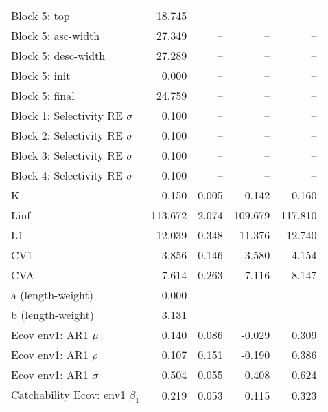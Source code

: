 \documentclass[
]{article}
\begin{document}
\begin{landscape}
\begin{longtable}[t]{lrrrr}
\addlinespace
Block 5: top & 18.745 & -- & -- & --\\
Block 5: asc-width & 27.349 & -- & -- & --\\
Block 5: desc-width & 27.289 & -- & -- & --\\
Block 5: init & 0.000 & -- & -- & --\\
Block 5: final & 24.759 & -- & -- & --\\
\addlinespace
Block 1: Selectivity RE $\sigma$ & 0.100 & -- & -- & --\\
Block 2: Selectivity RE $\sigma$ & 0.100 & -- & -- & --\\
Block 3: Selectivity RE $\sigma$ & 0.100 & -- & -- & --\\
Block 4: Selectivity RE $\sigma$ & 0.100 & -- & -- & --\\
K & 0.150 & 0.005 & 0.142 & 0.160\\
\addlinespace
Linf & 113.672 & 2.074 & 109.679 & 117.810\\
L1 & 12.039 & 0.348 & 11.376 & 12.740\\
CV1 & 3.856 & 0.146 & 3.580 & 4.154\\
CVA & 7.614 & 0.263 & 7.116 & 8.147\\
a (length-weight) & 0.000 & -- & -- & --\\
\addlinespace
b (length-weight) & 3.131 & -- & -- & --\\
Ecov env1: AR1 $\mu$ & 0.140 & 0.086 & -0.029 & 0.309\\
Ecov env1: AR1 $\rho$ & 0.107 & 0.151 & -0.190 & 0.386\\
Ecov env1: AR1 $\sigma$ & 0.504 & 0.055 & 0.408 & 0.624\\
Catchability Ecov: env1 $\beta_1$ & 0.219 & 0.053 & 0.115 & 0.323\\*
\end{longtable}
\end{landscape}
\end{document}
